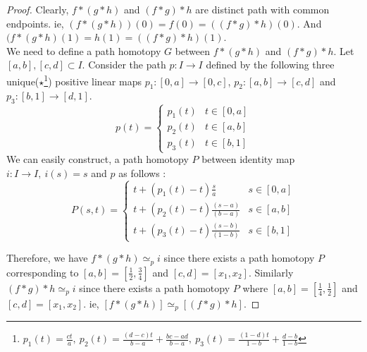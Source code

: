 \begin{proof}
	Clearly, $f \ast (g \ast h)$ and $(f \ast g) \ast h$ are distinct path with common endpoints.
	ie, $(f \ast (g \ast h))(0) = f(0) = ((f \ast g) \ast h)(0)$.
	And $(f \ast (g \ast h)(1) = h(1) = ((f \ast g) \ast h)(1)$.\\

	We need to define a path homotopy $G$ between $f \ast (g \ast h)$ and $(f \ast g) \ast h$.
	Let $[a,b], [c,d] \subset I$.
	Consider the path $p : I \to I$ defined by the following three unique($\star$\footnote{$p_1(t) = \frac{ct}{a},\ p_2(t) = \frac{(d-c)t}{b-a}+\frac{bc-ad}{b-a},\ p_3(t) = \frac{(1-d)t}{1-b}+\frac{d-b}{1-b}$}) positive linear maps $p_1 : [0,a] \to [0,c]$, $p_2 : [a,b] \to [c,d]$ and $p_3 : [b,1] \to [d,1]$.
	\[ p(t) = \begin{cases} p_1(t) & t \in [0,a] \\ p_2(t) & t \in [a,b] \\ p_3(t) & t \in [b,1] \end{cases} \]
	We can easily construct, a path homotopy $P$ between identity map $i : I \to I,\ i(s) = s$ and $p$ as follows :
	\[ P(s,t) = \begin{cases} t + (p_1(t)-t)\frac{s}{a} & s \in [0,a] \\ t + (p_2(t)-t)\frac{(s-a)}{(b-a)} & s \in [a,b] \\ t+(p_3(t)-t)\frac{(s-b)}{(1-b)} & s \in [b,1] \end{cases} \]

		Therefore, we have $f \ast (g \ast h) \simeq_p i$ since there exists a path homotopy $P$ corresponding to  $[a,b]=[\frac{1}{2},\frac{3}{4}]$ and $[c,d] = [x_1,x_2]$.
		Similarly $(f \ast g) \ast h \simeq_p i$ since there exists a path homotopy $P$ where $[a,b]=[\frac{1}{4},\frac{1}{2}]$ and $[c,d] = [x_1,x_2]$.
		ie, $[f \ast (g \ast h)] \simeq_p [(f \ast g) \ast h]$.
\end{proof}


